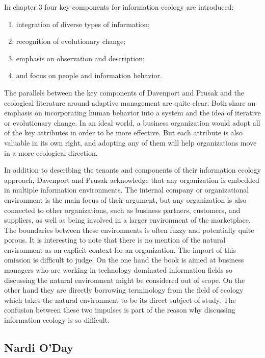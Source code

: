 In chapter 3 four key components for information ecology are introduced: 

\begin{enumerate}
\item integration of diverse types of information;
\item recognition of evolutionary change;
\item emphasis on observation and description;
\item and focus on people and information behavior.
\end{enumerate}

The parallels between the key components of Davenport and Prusak and the ecological literature around adaptive management are quite clear. Both share an emphasis on incorporating human behavior into a system and the idea of iterative or evolutionary change.  In an ideal world, a business organization would adopt all of the key attributes in order to be more effective. But each attribute is also valuable in its own right, and adopting any of them will help organizations move in a more ecological direction.

In addition to describing the tenants and components of their information ecology approach, Davenport and Prusak acknowledge that any organization is embedded in multiple information environments. The internal company or organizational environment is the main focus of their argument, but any organization is also connected to other organizations, such as business partners, customers, and suppliers, as well as being involved in a larger environment of the marketplace. The boundaries between these environments is often fuzzy and potentially quite porous. It is interesting to note that there is no mention of the natural environment as an explicit context for an organization. The import of this omission is difficult to judge. On the one hand the book is aimed at business managers who are working in technology dominated information fields so discussing the natural environment might be considered out of scope. On the other hand they are directly borrowing terminology from the field of ecology which takes the natural environment to be its direct subject of study. The confusion between these two impulses is part of the reason why discussing information ecology is so difficult.

\subsection{Nardi O'Day}

